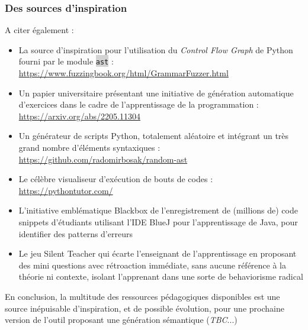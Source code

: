 \documentclass[11pt,a4paper]{article}
\let\cite\parencite
\newcommand{\code}[1]{\colorbox{lightgray}{\texttt{\small #1}}}
\begin{document}
\subsubsection*{Des sources d'inspiration}
A citer également :
\begin{itemize}
    \item La source d'inspiration pour l'utilisation du \textit{Control Flow Graph} de Python fourni par le module \code{ast} :  \url{https://www.fuzzingbook.org/html/GrammarFuzzer.html}
    \item Un papier universitaire présentant une initiative de génération automatique d'exercices dans le cadre de l'apprentissage de la programmation : \url{https://arxiv.org/abs/2205.11304}
    \item Un générateur de scripts Python, totalement aléatoire et intégrant un très grand nombre d'éléments syntaxiques : \url{https://github.com/radomirbosak/random-ast}
    \item Le célèbre visualiseur d'exécution de bouts de codes : \url{https://pythontutor.com/}
    \item L'initiative emblématique Blackbox de l'enregistrement de (millions de) code snippets d'étudiants utilisant l'IDE BlueJ pour l'apprentissage de Java, pour identifier des patterns d'erreurs \cite{ Altadmri_Brown_2015}
    \item Le jeu Silent Teacher \cite{SilentTeacher} qui écarte l'enseignant de l'apprentissage en proposant des mini questions avec rétroaction immédiate, sans aucune référence à la théorie ni contexte, isolant l'apprenant dans une sorte de behaviorisme radical
\end{itemize} 
\par En conclusion, la multitude des ressources pédagogiques disponibles est une source inépuisable d'inspiration, et de possible évolution, pour une prochaine version de l'outil proposant une génération sémantique (\textit{TBC}...)
\end{document}
